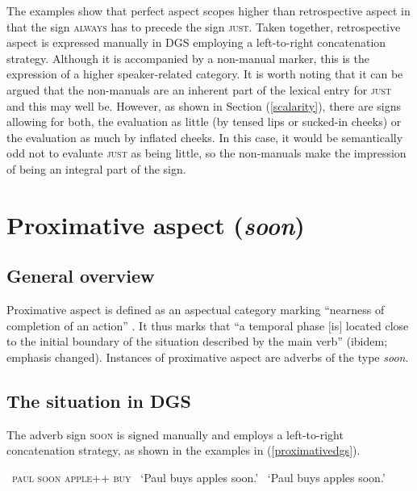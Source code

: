 \noindent The examples show that perfect aspect scopes higher than retrospective aspect in that the sign \textsc{always} has to precede the sign \textsc{just}. Taken together, retrospective aspect is expressed manually in DGS employing a left-to-right concatenation strategy. Although it is accompanied by a non-manual marker, this is the expression of a higher speaker-related category. It is worth noting that it can be argued that the non-manuals are an inherent part of the lexical entry for \textsc{just} and this may well be. However, as shown in Section (\ref{scalarity}), there are signs allowing for both, the evaluation as little (by tensed lips or sucked-in cheeks) or the evaluation as much by inflated cheeks. In this case, it would be semantically odd not to evaluate \textsc{just} as being little, so the non-manuals make the impression of being an integral part of the sign. 


\section{Proximative aspect (\textit{soon})}
\subsection{General overview}
Proximative aspect is defined as an aspectual category marking ``nearness of completion of an action'' \citep[36]{heine1994genesis}. It thus marks that ``a temporal phase $[$is$]$ located close to the initial boundary of the situation described by the main verb'' (ibidem; emphasis changed). Instances of proximative aspect are adverbs of the type \textit{soon}. 

\subsection{The situation in DGS}
The adverb sign \textsc{soon} is signed manually and employs a left-to-right concatenation strategy, as shown in the examples in (\ref{proximativedgs}).

\begin{exe}
\ex \label{proximativedgs}\begin{xlist} 
\ex\textcolor{white}{*}{\textsc{paul soon apple++ buy}} 
\glt \textcolor{white}{*}`Paul buys apples soon.' \label{ex:proximativedgsa}
\glt \textcolor{white}{*}`Paul buys apples soon.' \label{ex:proximativedgsb}
\end{xlist}
\end{exe} 

